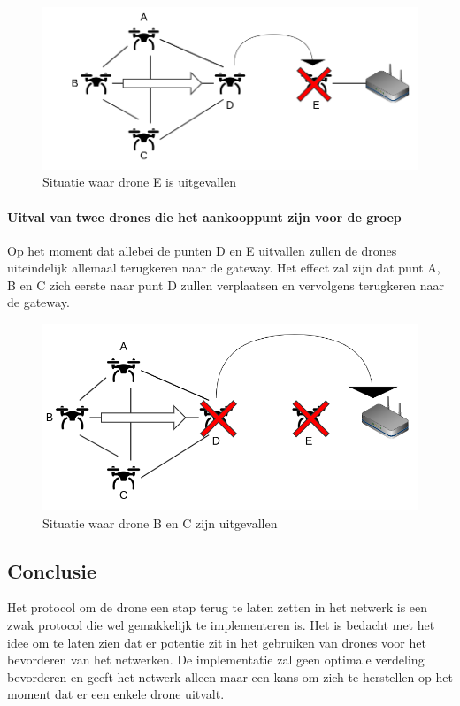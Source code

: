 \documentclass[a4paper, 11pt, oneside]{report}
\begin{document}
\begin{figure}[H]
	\begin{center}\includegraphics[width=.8\linewidth]{Afbeeldingen/droneopstelling_GroepXL_een_kapot.png}\end{center}
	\caption{Situatie waar drone E is uitgevallen}
	\label{fig:groep_E_kapot}
\end{figure}

\paragraph{Uitval van twee drones die het aankooppunt zijn voor de groep}
Op het moment dat allebei de punten D en E uitvallen zullen de drones uiteindelijk allemaal terugkeren naar de gateway. 
Het effect zal zijn dat punt A, B en C zich eerste naar punt D zullen verplaatsen en vervolgens terugkeren naar de gateway.    
\begin{figure}[H]
	\begin{center}\includegraphics[width=.85\linewidth]{Afbeeldingen/droneopstelling_Groep_meer_kapot.png}\end{center}
	\caption{Situatie waar drone B en C zijn uitgevallen}
	\label{fig:groep_B_C_kapot}
\end{figure}


\subsection{Conclusie}

Het protocol om de drone een stap terug te laten zetten in het netwerk is een zwak protocol die wel gemakkelijk te implementeren is.
Het is bedacht met het idee om te laten zien dat er potentie zit in het gebruiken van drones voor het bevorderen van het netwerken.
De implementatie zal geen optimale verdeling bevorderen en geeft het netwerk alleen maar een kans om zich te herstellen op het moment dat er een enkele drone uitvalt.
\end{document}
